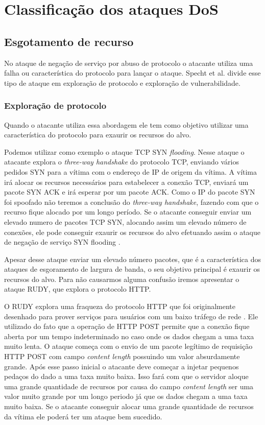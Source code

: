 \section{Classificação dos ataques DoS} \label{sec:2.Categoria dos ataques DoS}

\subsection{ Esgotamento de recurso }
No ataque de negação de serviço por abuso de protocolo o atacante utiliza uma falha ou característica do protocolo para lançar o ataque. Specht et al.\cite{Specht2004} divide esse tipo de ataque em exploração de protocolo e exploração de vulnerabilidade.

\subsubsection*{ Exploração de protocolo }
Quando o atacante utiliza essa abordagem ele tem como objetivo utilizar uma característica do protocolo para exaurir os recursos do alvo. 

Podemos utilizar como exemplo o ataque TCP SYN \textit{flooding}. Nesse ataque o atacante explora o \textit{three-way handshake} do protocolo TCP, enviando vários pedidos SYN para a vítima com o endereço de IP de origem da vítima. A vítima irá alocar os recursos necessários para estabelecer a conexão TCP, enviará um pacote SYN ACK e irá esperar por um pacote ACK. Como o IP do pacote SYN foi spoofado não teremos a conclusão do \textit{three-way handshake}, fazendo com que o recurso fique alocado por um longo período. Se o atacante conseguir enviar um elevado numero de pacotes TCP SYN, alocando assim um elevado número de conexões, ele pode conseguir exaurir os recursos do alvo efetuando assim o ataque de negação de serviço SYN flooding \cite{tcpsynflood}.

Apesar desse ataque enviar um elevado número pacotes, que é a característica dos ataques de esgoramento de largura de banda, o seu objetivo principal é exaurir os recursos do alvo. Para não causarmos alguma confusão iremos apresentar o ataque \acrfull{RUDY}, que explora o protocolo HTTP. 

O RUDY explora uma fraqueza do protocolo HTTP que foi originalmente desenhado para prover serviços para usuários com um baixo tráfego de rede . Ele utilizado do fato que a operação de HTTP POST permite que a conexão fique aberta por um tempo indeterminado no caso onde os dados chegam a uma taxa muito lenta. O ataque começa com o envio de um pacote legítimo de requisição HTTP POST com campo \textit{content length} possuindo um valor absurdamente grande. Após esse passo inicial o atacante deve começar a injetar pequenos pedaços do dado a uma taxa muito baixa. Isso fará com que o servidor aloque uma grande quantidade de recursos por causa do campo \textit{content length} ser uma valor muito grande por um longo periodo já que os dados chegam a uma taxa muito baixa. Se o atacante conseguir alocar uma grande quantidade de recursos da vítima ele poderá ter um ataque bem sucedido\cite{Alomari2012}.   


